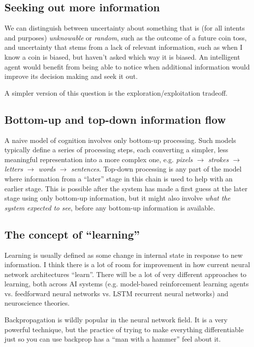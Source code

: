 \documentclass[10pt,a4paper]{article}
\newcommand{\nquote}[1]{``{#1}''}
\begin{document}
\subsection{Seeking out more information}
We can distinguish between uncertainty about something that is (for all intents and purposes) \emph{unknowable} or \emph{random}, such as the outcome of a future coin toss, and uncertainty that stems from a lack of relevant information, such as when I know a coin is biased, but haven't asked which way it is biased. An intelligent agent would benefit from being able to notice when additional information would improve its decision making and seek it out.

A simpler version of this question is the exploration/exploitation tradeoff.

\subsection{Bottom-up and top-down information flow}
A naive model of cognition involves only bottom-up processing. Such models typically define a series of processing steps, each converting a simpler, less meaningful representation into a more complex one, e.g. \emph{pixels $\rightarrow$ strokes $\rightarrow$ letters $\rightarrow$ words $\rightarrow$ sentences}. Top-down processing is any part of the model where information from a \nquote{later} stage in this chain is used to help with an earlier stage. This is possible after the system has made a first guess at the later stage using only bottom-up information, but it might also involve \emph{what the system expected to see}, before any bottom-up information is available.

\subsection{The concept of \nquote{learning}}
Learning is usually defined as some change in internal state in response to new information. I think there is a lot of room for improvement in how current neural network architectures \nquote{learn}. There will be a lot of very different approaches to learning, both across AI systems (e.g. model-based reinforcement learning agents vs. feedforward neural networks vs. LSTM recurrent neural networks) and neuroscience theories.

Backpropagation is wildly popular in the neural network field. It is a very powerful technique, but the practice of trying to make everything differentiable just so you can use backprop has a \nquote{man with a hammer} feel about it.
\end{document}
